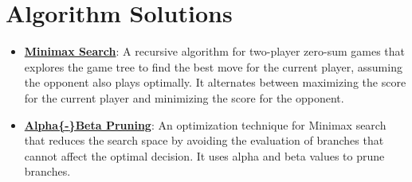 \documentclass{article}%
\begin{document}
\section{Algorithm Solutions}%
\label{sec:AlgorithmSolutions}%
\begin{itemize}[leftmargin=*]%
\item \href{https://purdue.brightspace.com/d2l/common/assets/pdfjs-d2l-dist/1.0.14-legacy/web/viewer.html?file=\%2Fcontent\%2Fenforced\%2F1095467-wl.202510.CS.24300.001\%2F02L2-Intro.pdf\%3Fou\%3D1095467\&lang=en-us\&container=d2l-fileviewer-rendered-pdf\&fullscreen=d2l-fileviewer-rendered-pdf-dialog\&height=667#page=22}{\textbf{Minimax Search}}: A recursive algorithm for two{-}player zero{-}sum games that explores the game tree to find the best move for the current player, assuming the opponent also plays optimally. It alternates between maximizing the score for the current player and minimizing the score for the opponent.%
\item \href{https://purdue.brightspace.com/d2l/common/assets/pdfjs-d2l-dist/1.0.14-legacy/web/viewer.html?file=\%2Fcontent\%2Fenforced\%2F1095467-wl.202510.CS.24300.001\%2F02L2-Intro.pdf\%3Fou\%3D1095467\&lang=en-us\&container=d2l-fileviewer-rendered-pdf\&fullscreen=d2l-fileviewer-rendered-pdf-dialog\&height=667#page=23}{\textbf{Alpha\{{-}\}Beta Pruning}}: An optimization technique for Minimax search that reduces the search space by avoiding the evaluation of branches that cannot affect the optimal decision. It uses alpha and beta values to prune branches.%
\end{itemize}%
\end{document}
